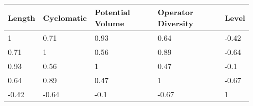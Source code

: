 \begin{tabular}{lllll}
Length & Cyclomatic & Potential Volume & Operator Diversity & Level \\ 
\hline 
1 & 0.71 & 0.93 & 0.64 & -0.42 \\ 
0.71 & 1 & 0.56 & 0.89 & -0.64 \\ 
0.93 & 0.56 & 1 & 0.47 & -0.1 \\ 
0.64 & 0.89 & 0.47 & 1 & -0.67 \\ 
-0.42 & -0.64 & -0.1 & -0.67 & 1 \\ 
\hline 
\end{tabular}